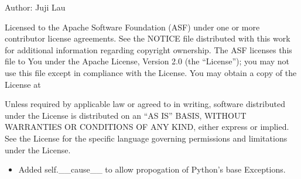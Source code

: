 \documentclass[letterpaper,10pt,english]{sphinxmanual}
\begin{document}
\sphinxAtStartPar
Author: Juji Lau
\begin{description}
\sphinxAtStartPar
Licensed to the Apache Software Foundation (ASF) under one or more
contributor license agreements. See the NOTICE file distributed with
this work for additional information regarding copyright ownership.
The ASF licenses this file to You under the Apache License, Version 2.0
(the “License”); you may not use this file except in compliance with
the License. You may obtain a copy of the License at
\begin{quote}

\sphinxAtStartPar
{}
\end{quote}

\sphinxAtStartPar
Unless required by applicable law or agreed to in writing, software
distributed under the License is distributed on an “AS IS” BASIS,
WITHOUT WARRANTIES OR CONDITIONS OF ANY KIND, either express or implied.
See the License for the specific language governing permissions and
limitations under the License.

\begin{itemize}
\item {} 
\sphinxAtStartPar
Added self.\_\_cause\_\_ to allow propogation of Python’s base Exceptions.

\end{itemize}

\end{description}
\end{document}
